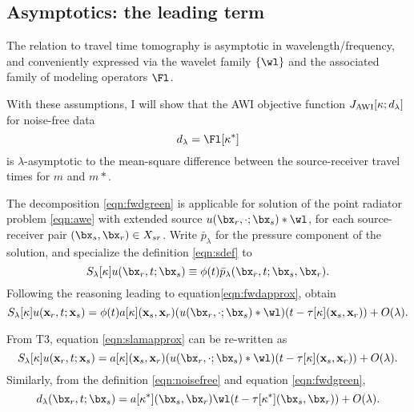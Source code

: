 \subsection{Asymptotics: the leading term}
The relation to travel time tomography is asymptotic
in wavelength/frequency, and conveniently expressed via the wavelet
family $\{\wl\}$ and the associated family of modeling operators
$\Fl$.

With these assumptions, I will show that the AWI objective function $J_{\rm AWI}[\kappa;d_{\lambda}]$
for noise-free data
\begin{equation}
  \label{eqn:noisefree}
  d_{\lambda}=\Fl[\kappa^*]
\end{equation}
is $\lambda$-asymptotic to the mean-square difference between the
source-receiver travel times for $m$ and $m*$. 

The decomposition \ref{eqn:fwdgreen} is applicable for solution of the point
radiator problem \ref{eqn:awe} with extended source
$u(\bx_r,\cdot;\bx_s)*\wl$, for each source-receiver pair
$(\bx_s,\bx_r)\in X_{sr}$. Write $\bar{p}_{\lambda}$ for the pressure
component of the solution, and specialize the definition
\ref{eqn:sdef} to
\begin{equation}
  \label{eqn:sdeflam}
  S_{\lambda}[\kappa]u(\bx_r,t;\bx_s) \equiv \phi(t)\bar{p}_{\lambda}(\bx_r,t;\bx_s,\bx_r).
\end{equation}
Following the reasoning leading to
equation\ref{eqn:fwdapprox}, obtain
\begin{equation}
  \label{eqn:slamapprox}
  S_{\lambda}[\kappa]u({\bf x}_r,t;{\bf x}_s) = \phi(t)a[\kappa]({\bf x}_s,{\bf
    x}_r) (u(\bx_r,\cdot;\bx_s)*\wl)(t-\tau[\kappa]({\bf x}_s,{\bf x}_r)) + O(\lambda).
\end{equation}



From T3, equation \ref{eqn:slamapprox} can be re-written as
\begin{equation}
  \label{eqn:slambis}
  S_{\lambda}[\kappa]u({\bf x}_r,t;{\bf x}_s) = a[\kappa]({\bf x}_s,{\bf
    x}_r) (u(\bx_r,\cdot;\bx_s)*\wl)(t-\tau[\kappa]({\bf x}_s,{\bf x}_r)) + O(\lambda).
\end{equation}
Similarly, from the definition \ref{eqn:noisefree} and equation
\ref{eqn:fwdgreen},
\begin{equation}
  \label{eqn:noisefreeapprox}
  d_{\lambda}(\bx_r,t;\bx_s) = a[\kappa^*](\bx_s,\bx_r) \wl(t-\tau[\kappa^*](\bx_s,\bx_r)) + O(\lambda).
\end{equation}



